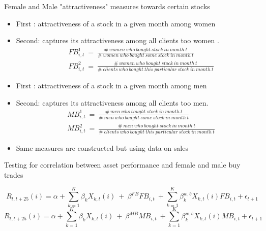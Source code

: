 \documentclass{beamer}
\begin{document}
\begin{frame}{Female and Male "attractiveness" measures towards certain stocks}

\begin{itemize}
\item First : attractiveness of a stock in a given month among women
\item Second: captures its attractiveness among all clients too women . 
\begin{equation}
\begin{aligned}
    & FB^1_{i,t}\ =\ \frac{\#\ women\ who\ bought\ stock\ in\ month\ t}{\#\ women\ who\ bought\ some\ stock\ in\ month\ t}\\
    & FB^2_{i,t}\ =\ \frac{\#\ women\ who\ bought\ stock\ in\ month\ t}{\#\ clients\ who\ bought\ this\ particular\ stock\ in\ month\ t}
\end{aligned}
\end{equation}
\item First : attractiveness of a stock in a given month among men
\item Second: captures its attractiveness among all clients too men. 
\begin{equation}
\begin{aligned}
    & MB^1_{i,t}\ =\ \frac{\#\ men\ who\ bought\ stock\ in\ month\ t}{\#\ men\ who\ bought\ some\ stock\ in\ month\ t}\\
    & MB^2_{i,t}\ =\ \frac{\#\ men\ who\ bought\ stock\ in\ month\ t}{\#\ clients\ who\ bought\ this\ particular\ stock\ in\ month\ t}
\end{aligned}
\end{equation}
\item Same measures are constructed but using data on sales

\end{itemize}

\end{frame}

\begin{frame}{Testing for correlation between asset performance and female and male buy trades}

\begin{equation}
\label{eq:FB}
     R_{t,t+25}(i) = \alpha + \sum_{k=1}^K\beta_k X_{k,t}(i)\ +\ \beta^{FB} FB_{i,t}\ + \sum_{k=1}^K\beta_k^{w,b} X_{k,t}(i)FB_{i,t}  + \epsilon_{t+1}
\end{equation}
\begin{equation}
\label{eq:MB}
     R_{t,t+25}(i) = \alpha + \sum_{k=1}^K\beta_k X_{k,t}(i)\ +\ \beta^{MB} MB_{i,t}\ + \sum_{k=1}^K\beta_k^{w,b} X_{k,t}(i)MB_{i,t}  + \epsilon_{t+1}
\end{equation}

\end{frame}
\end{document}
